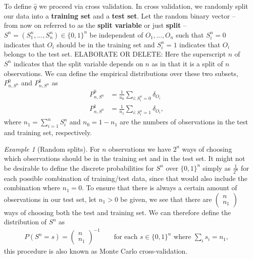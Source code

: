 \documentclass[11pt, a4paper]{article}
\renewcommand\tag[1]{\color{blue} #1 \color{black}}
\theoremstyle{definition}
\theoremstyle{remark}
\newtheorem{example}{Example}
\newcommand{\q}{q}
\newcommand{\Sn}{S^n}
\begin{document}
To define $ \hat{\q} $ we proceed via cross validation. In cross
validation, we randomly split our data into a \textbf{training set}
and a \textbf{test set}. Let the random binary vector -- from now on
referred to as the \textbf{split variable} or just \textbf{split} --
$ \Sn = (\Sn_1,\ldots,\Sn_n) \in \{0,1\}^{n} $ be independent of
$ O_1,\ldots, O_n $ such that $ \Sn_i = 0 $ indicates that $ O_i $
should be in the training set and $ \Sn_i = 1 $ indicates that $ O_i $
belongs to the test set. \tag{ELABORATE OR DELETE: Here the superscript $ n $ of $ \Sn $
indicates that the split variable depends on $ n $ as in that it is a
split of $ n $ observations. } We can define the empirical distributions
over these two subsets, $ P_{n,\Sn}^0$ and $ P_{n,\Sn}^{1} $ as
\begin{align*}
    P_{n,\Sn}^{0} &= \frac{1}{n_0} \sum_{i: \Sn_i = 0} \delta_{O_i} \\
    P_{n,\Sn}^{1} &= \frac{1}{n_1} \sum_{i: \Sn_i = 1} \delta_{O_i},
\end{align*}
where $ n_1 = \sum_{i = 1}^{n} \Sn_i$ and $n_0 = 1-n_1$ are the
numbers of observations in the test and training set, respectively.

\begin{example}[Random splits] \label{splits} For $ n $ observations
  we have $ 2^{n} $ ways of choosing which observations should be in
  the training set and in the test set. It might not be desirable to
  define the discrete probabilities for $ \Sn $ over $ \{0,1\}^{n} $
  simply as $ \frac{1}{2^{n}} $ for each possible combination of
  training/test data, since that would also include the combination
  where $ n_1 = 0 $. To ensure that there is always a certain amount
  of observations in our test set, let $ n_1 > 0 $ be given, we see
  that there are $ \begin{pmatrix} n \\ n_1
    \end{pmatrix}$ ways of choosing both the test and training set. We can therefore define the distribution of $ \Sn $ as 
    \begin{align*}
        P \left(\Sn = s \right) = \begin{pmatrix}
            n \\ n_1
    \end{pmatrix}^{-1} \qquad \text{for each } s \in \{0,1\}^{n} \text{ where } \sum_{i} s_i = n_1,
    \end{align*}
    this procedure is also known as Monte Carlo cross-validation.
\end{example}
\end{document}
